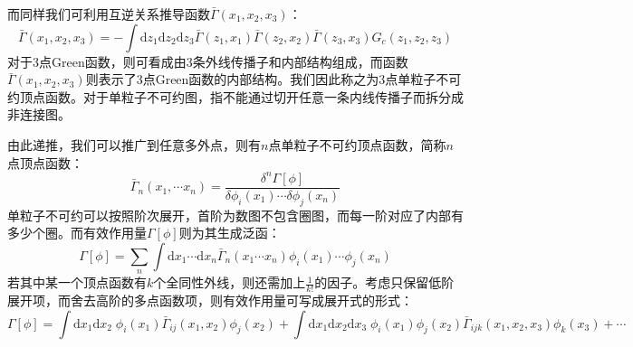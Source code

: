 而同样我们可利用互逆关系推导函数$\bar{\Gamma}(x_1,x_2,x_3)$：
\begin{equation}
\bar{\Gamma}(x_1,x_2,x_3)=-\int\mathrm{d}z_1\mathrm{d}z_2\mathrm{d}z_3 \bar{\Gamma}(z_1,x_1)\bar{\Gamma}(z_2,x_2)\bar{\Gamma}(z_3,x_3)G_c(z_1,z_2,z_3)
\end{equation}
对于3点Green函数，则可看成由3条外线传播子和内部结构组成，而函数$\bar{\Gamma}(x_1,x_2,x_3)$则表示了3点Green函数的内部结构。我们因此称之为3点单粒子不可约顶点函数。对于单粒子不可约图，指不能通过切开任意一条内线传播子而拆分成非连接图。

由此递推，我们可以推广到任意多外点，则有$n$点单粒子不可约顶点函数，简称$n$点顶点函数：
\begin{equation}
\bar{\Gamma}_n(x_1,\cdots x_n)=\frac{\delta^n\Gamma[\phi]}{\delta\phi_i(x_1)\cdots\delta\phi_j(x_n)}
\end{equation}
单粒子不可约可以按照阶次展开，首阶为数图不包含圈图，而每一阶对应了内部有多少个圈。而有效作用量$\Gamma[\phi]$则为其生成泛函：
\begin{equation}
\Gamma[\phi]=\sum_{n}\int\mathrm{d}x_1\cdots\mathrm{d}x_n\bar{\Gamma}_n(x_1\cdots x_n)\phi_i(x_1)\cdots\phi_j(x_n)
\end{equation}
若其中某一个顶点函数有$k$个全同性外线，则还需加上$\frac{1}{k!}$的因子。考虑只保留低阶展开项，而舍去高阶的多点函数项，则有效作用量可写成展开式的形式：
\begin{equation}
\Gamma[\phi]=\int\mathrm{d}x_1\mathrm{d}x_2\;\phi_i(x_1)\bar{\Gamma}_{ij}(x_1,x_2)\phi_j(x_2)+\int\mathrm{d}x_1\mathrm{d}x_2\mathrm{d}x_3\;\phi_i(x_1)\phi_j(x_2)\bar{\Gamma}_{ijk}(x_1,x_2,x_3)\phi_k(x_3)+\cdots
\end{equation}

